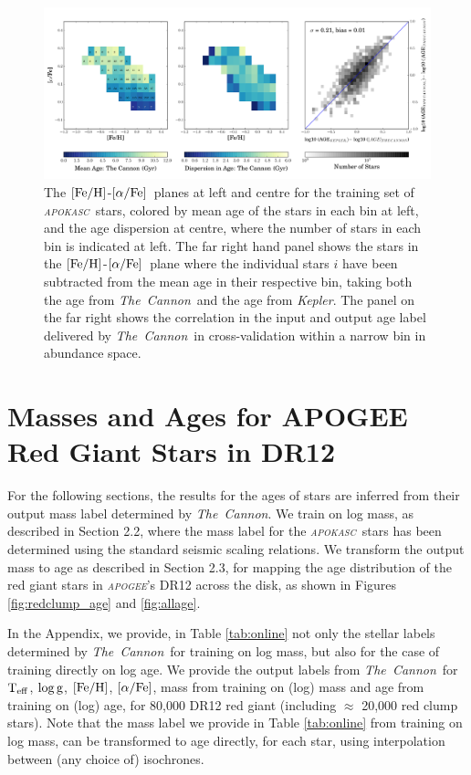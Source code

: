 \documentclass[12pt, preprint]{aastex}
\newcommand{\project}[1]{\textsl{#1}}
\newcommand{\tc}{\project{The~Cannon}}
\newcommand{\apogee}{\project{\textsc{apogee}}}
\newcommand{\apokasc}{\project{\textsc{apokasc}}}
\newcommand{\kepler}{\project{Kepler}}
\newcommand{\teff}{\mbox{$\rm T_{eff}$}}
\newcommand{\feh}{\mbox{$\rm [Fe/H]$}}
\newcommand{\alphafe}{\mbox{$\rm [\alpha/Fe]$}}
\newcommand{\logg}{\mbox{$\rm \log g$}}
\begin{document}
\begin{figure}[p]
\centering
  \includegraphics[scale=0.4]{./plots/alpha_feh_rc2.pdf}
    \caption{The \feh-\alphafe\ planes at left and centre for the training set of \apokasc\ stars, colored by mean age of the stars in each bin at left,  and the age dispersion at centre, where the number of stars in each bin is indicated at left. The far right hand panel shows the stars in the \feh-\alphafe\ plane where the individual stars $i$ have been subtracted from the mean age in their respective bin, taking both the age from \tc\ and the age from \kepler. The panel on the far right shows the correlation in the input and output age label delivered by \tc\ in cross-validation within a narrow bin in abundance space.  }
\label{fig:alphabins}
\end{figure}

\section{Masses and Ages for APOGEE Red Giant Stars in DR12} 

For the following sections, the results for the ages of stars are inferred from their output mass label determined by \tc. We train on log mass, as described in Section 2.2, where the mass label for the \apokasc\ stars has been determined using the standard seismic scaling relations. We transform the output mass to age as described in Section 2.3, for mapping the age distribution of the red giant stars in \apogee's DR12 across the disk, as shown in Figures \ref{fig:redclump_age} and \ref{fig:allage}. 

In the Appendix, we provide, in Table \ref{tab:online} not only the stellar labels determined by \tc\ for training on log mass, but also for the case of training directly on log age. We provide the output labels from \tc\ for \teff, \logg, \feh, \alphafe, mass from training on (log) mass and age from training on (log) age, for 80,000 DR12 red giant (including $\approx$ 20,000 red clump stars). Note that the mass label we provide in Table \ref{tab:online} from training on log mass, can be transformed to age directly, for each star, using interpolation between (any choice of) isochrones. 
\end{document}
